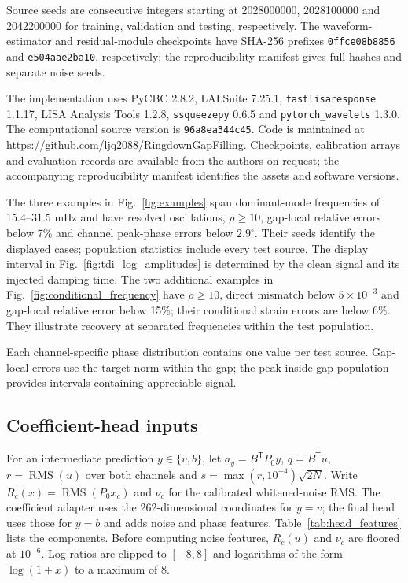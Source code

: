 \documentclass[10pt,prd,aps,a4paper,twocolumn,superscriptaddress,nofootinbib,floatfix]{revtex4-2}
\begin{document}
Source seeds are consecutive integers starting at 2028000000, 2028100000 and 2042200000 for training, validation and testing, respectively. The waveform-estimator and residual-module checkpoints have SHA-256 prefixes \texttt{0ffce08b8856} and \texttt{e504aae2ba10}, respectively; the reproducibility manifest gives full hashes and separate noise seeds.

The implementation uses PyCBC 2.8.2, LALSuite 7.25.1, \texttt{fastlisaresponse} 1.1.17, LISA Analysis Tools 1.2.8, \texttt{ssqueezepy} 0.6.5 and \texttt{pytorch\_wavelets} 1.3.0. The computational source version is \texttt{96a8ea344c45}. Code is maintained at \url{https://github.com/ljq2088/RingdownGapFilling}. Checkpoints, calibration arrays and evaluation records are available from the authors on request; the accompanying reproducibility manifest identifies the assets and software versions.

The three examples in Fig.~\ref{fig:examples} span dominant-mode frequencies of 15.4--31.5 mHz and have resolved oscillations, $\rho\ge10$, gap-local relative errors below 7\% and channel peak-phase errors below $2.9^\circ$. Their seeds identify the displayed cases; population statistics include every test source. The display interval in Fig.~\ref{fig:tdi_log_amplitudes} is determined by the clean signal and its injected damping time. The two additional examples in Fig.~\ref{fig:conditional_frequency} have $\rho\ge10$, direct mismatch below $5\times10^{-3}$ and gap-local relative error below 15\%; their conditional strain errors are below 6\%. They illustrate recovery at separated frequencies within the test population.

Each channel-specific phase distribution contains one value per test source. Gap-local errors use the target norm within the gap; the peak-inside-gap population provides intervals containing appreciable signal.



\subsection{Coefficient-head inputs}
For an intermediate prediction $y\in\{v,b\}$, let $a_y=B^{\mathsf T}P_0y$, $q=B^{\mathsf T}u$, $r=\operatorname{RMS}(u)$ over both channels and $s=\max(r,10^{-4})\sqrt{2N}$. Write $R_c(x)=\operatorname{RMS}(P_0x_c)$ and $\nu_c$ for the calibrated whitened-noise RMS. The coefficient adapter uses the 262-dimensional coordinates for $y=v$; the final head uses those for $y=b$ and adds noise and phase features. Table~\ref{tab:head_features} lists the components. Before computing noise features, $R_c(u)$ and $\nu_c$ are floored at $10^{-6}$. Log ratios are clipped to $[-8,8]$ and logarithms of the form $\log(1+x)$ to a maximum of 8.
\end{document}
